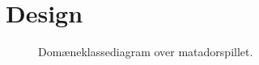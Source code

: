 \chapter{Design}\label{chap:Design}

\begin{figure}
\caption{Domæneklassediagram over matadorspillet.}\label{fig:tikzKlasseKontoPlayer17}
\centering

\end{figure}